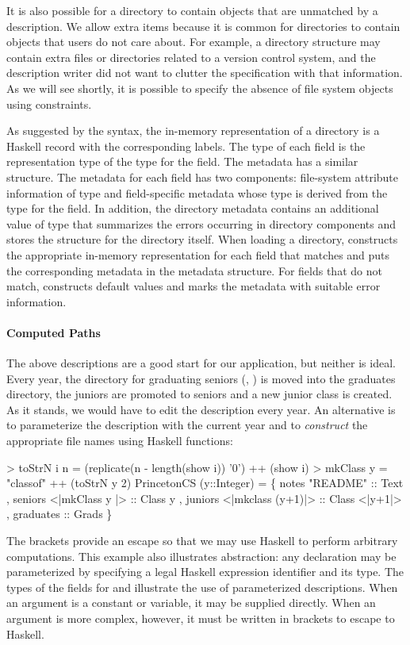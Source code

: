 It is also possible for a directory to contain objects
that are unmatched by a description.  We allow extra items because it
is common for directories to contain objects that users do not care
about.  For example, a directory structure may contain extra files or
directories related to a version control system, and the
description writer did not want to clutter the \forest{} specification
with that information.  As we will see shortly, it is possible to
specify the absence of file system objects using constraints.

As suggested by the syntax, the in-memory representation of a
directory is a Haskell record with the corresponding labels.  The type
of each field is the representation type of the \forest{} type for the
field. The metadata has a similar structure. The metadata for
each field has two components: file-system attribute information of
type  and field-specific metadata whose type is derived
from the \forest{} type for the field.  In addition, the directory
metadata contains an additional value of type  that 
summarizes the errors occurring in directory components and stores the
 structure for 
the directory itself.
When loading a directory, \forest{} constructs the appropriate in-memory
representation for each field that matches and puts the corresponding
metadata in the metadata structure. For fields that do not 
match, \forest{} constructs default values and marks the metadata with
suitable error information.


\paragraph*{Computed Paths}
\label{sec:computed-paths}

The above descriptions are a good start for our application, but neither
is ideal.  Every year, the directory for graduating seniors 
(\ie{}, ) is moved into the graduates directory,
the juniors are promoted to seniors and a new junior class is created.
As it stands, we would have to edit the description every year.
An alternative is to parameterize the description with the current year and
to \textit{construct} the appropriate file names using Haskell functions:
\begin{code}
> toStrN i n = (replicate(n - length(show i)) '0') 
               ++ (show i)
> mkClass y = "classof" ++ (toStrN y 2)
\mbox{}
 PrincetonCS (y::Integer) = 
  \{ notes    "README" :: Text
  , seniors  <|mkClass y    |> :: Class y
  , juniors  <|mkclass (y+1)|> :: Class <|y+1|>
  , graduates :: Grads
  \}
\end{code}
The brackets  provide an escape so that we may use
Haskell to perform arbitrary computations.  This example also
illustrates abstraction: any \forest{} declaration may be
parameterized by specifying a legal Haskell expression identifier and
its type.  The types of the fields for  and 
illustrate the use of parameterized descriptions.
When an argument is a constant or variable,
it may be supplied directly.  When an argument is more complex,
however, it must be written in brackets to escape to Haskell.

